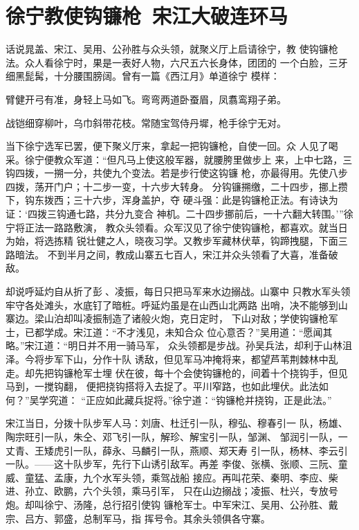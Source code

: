 \chapter{徐宁教使钩镰枪~宋江大破连环马}

话说晁盖、宋江、吴用、公孙胜与众头领，就聚义厅上启请徐宁，教
使钩镰枪法。众人看徐宁时，果是一表好人物，六尺五六长身体，团团的
一个白脸，三牙细黑髭髯，十分腰围膀阔。曾有一篇《西江月》单道徐宁
模样：

臂健开弓有准，身轻上马如飞。弯弯两道卧蚕眉，凤翥鸾翔子弟。

战铠细穿柳叶，乌巾斜带花枝。常随宝驾侍丹墀，枪手徐宁无对。

当下徐宁选军已罢，便下聚义厅来，拿起一把钩镰枪，自使一回。众
人见了喝采。徐宁便教众军道：“但凡马上使这般军器，就腰胯里做步上
来，上中七路，三钩四拨，一搠一分，共使九个变法。若是步行使这钩镰
枪，亦最得用。先使八步四拨，荡开门户；十二步一变，十六步大转身。
分钩镰搠缴，二十四步，挪上攒下，钩东拨西；三十六步，浑身盖护，夺
硬斗强：此是钩镰枪正法。有诗诀为证：‘四拨三钩通七路，共分九变合
神机。二十四步挪前后，一十六翻大转围。’”徐宁将正法一路路敷演，
教众头领看。众军汉见了徐宁使钩镰枪，都喜欢。就当日为始，将选拣精
锐壮健之人，晓夜习学。又教步军藏林伏草，钩蹄拽腿，下面三路暗法。
不到半月之间，教成山寨五七百人，宋江并众头领看了大喜，准备破敌。

却说呼延灼自从折了彭、凌振，每日只把马军来水边搦战。山寨中
只教水军头领牢守各处滩头，水底钉了暗桩。呼延灼虽是在山西山北两路
出哨，决不能够到山寨边。梁山泊却叫凌振制造了诸般火炮，克日定时，
下山对敌；学使钩镰枪军士，已都学成。宋江道：“不才浅见，未知合众
位心意否？”吴用道：“愿闻其略。”宋江道：“明日并不用一骑马军，
众头领都是步战。孙吴兵法，却利于山林沮泽。今将步军下山，分作十队
诱敌，但见军马冲掩将来，都望芦苇荆棘林中乱走。却先把钩镰枪军士埋
伏在彼，每十个会使钩镰枪的，间着十个挠钩手，但见马到，一搅钩翻，
便把挠钩搭将入去捉了。平川窄路，也如此埋伏。此法如何？”吴学究道：
“正应如此藏兵捉将。”徐宁道：“钩镰枪并挠钩，正是此法。”

宋江当日，分拨十队步军人马：刘唐、杜迁引一队，穆弘、穆春引一
队，杨雄、陶宗旺引一队，朱仝、邓飞引一队，解珍、解宝引一队，邹渊、
邹润引一队，一丈青、王矮虎引一队，薛永、马麟引一队，燕顺、郑天寿
引一队，杨林、李云引一队。——这十队步军，先行下山诱引敌军。再差
李俊、张横、张顺、三阮、童威、童猛、孟康，九个水军头领，乘驾战船
接应。再叫花荣、秦明、李应、柴进、孙立、欧鹏，六个头领，乘马引军，
只在山边搦战；凌振、杜兴，专放号炮。却叫徐宁、汤隆，总行招引使钩
镰枪军士。中军宋江、吴用、公孙胜、戴宗、吕方、郭盛，总制军马，指
挥号令。其余头领俱各守寨。

